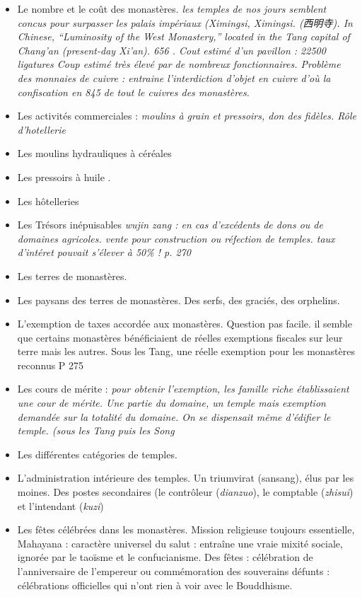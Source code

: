     \begin{itemize}
        \item Le nombre et le coût des monastères. \textit{les temples de nos jours semblent concus pour surpasser les palais impériaux (Ximingsi, Ximingsi. (西明寺). In Chinese, “Luminosity of the West Monastery,” located in the Tang capital of Chang’an (present-day Xi’an). 656 . Cout estimé d'un pavillon : 22500 ligatures Coup estimé très élevé par de nombreux fonctionnaires. Problème des monnaies de cuivre : entraine l'interdiction d'objet en cuivre d'où la confiscation en 845 de tout le cuivres des monastères.   }
        \item Les activités commerciales : \textit{moulins à grain et pressoirs, don des fidèles. Rôle d'hotellerie}
        \item Les moulins hydrauliques à céréales
        \item Les pressoirs à huile .
        \item Les hôtelleries
        \item Les Trésors inépuisables \textit{wujin zang : en cas d'excédents de dons ou de domaines agricoles. vente pour construction ou réfection de temples. taux d'intéret pouvait s'élever à 50\% ! p. 270 }
        \item Les terres de monastères.
        \item Les paysans des terres de monastères. Des serfs, des graciés, des orphelins. 
        \item L'exemption de taxes accordée aux monastères. Question pas facile. il semble que certains monastères bénéficiaient de réelles exemptions fiscales sur leur terre mais les autres. Sous les Tang, une réelle exemption pour les monastères reconnus P 275
        \item Les cours de mérite : \textit{pour obtenir l'exemption, les famille riche établissaient une cour de mérite. Une partie du domaine, un temple mais exemption demandée sur la totalité du domaine.  On se dispensait même d'édifier le temple. (sous les Tang puis les Song}
        \item Les différentes catégories de temples.
        \item L'administration intérieure des temples.  Un triumvirat (sansang), élus par les moines. Des postes secondaires (le contrôleur (\textit{dianzuo}), le comptable (\textit{zhisui}) et l'intendant (\textit{kuzi})
        \item Les fêtes célébrées dans les monastères. Mission religieuse toujours essentielle, Mahayana : caractère universel du salut : entraîne une vraie mixité sociale, ignorée par le taoïsme et le confucianisme. Des fêtes : célébration de l'anniversaire de l'empereur ou commémoration des souverains défunts  : célébrations officielles qui n'ont rien à voir avec le Bouddhisme. 

\end{itemize}
